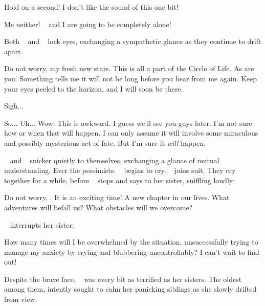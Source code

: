 \documentclass[main.tex]{subfiles}
\begin{document}
\par \Electra Hold on a second!  I don't like the sound of this one bit!

\par \Sterope Me neither! \rmelectra~ and I are going to be completely alone!

\par \nar Both \rmsterope~ and \rmelectra~ lock eyes, exchanging a sympathetic glance as they continue to drift apart.  

\par \Maia Do not worry, my fresh new stars. This is all a part of the Circle of Life.  As are you.  Something tells me it will not be long before you hear from me again. Keep your eyes peeled to the horizon, and I will soon be there.  

\par \Electra Sigh...  

\par \Taygete So... Uh... Wow.  This is awkward.  I guess we'll see you guys later.  I'm not sure how or when that will happen.  I can only assume it will involve some miraculous and possibly mysterious act of fate.  But I'm sure it \textit{will} happen.
  
\par \nar \rmtaygete~ and \rmalcyone~ snicker quietly to themselves, exchanging a glance of mutual understanding.  Ever the pessimists.  \rmelectra~ begins to cry.  \rmsterope~ joins suit.  They cry together for a while, before \rmsterope~ stops and says to her sister, sniffling loudly:

\par \Sterope Do not worry, \rmelectra.  It is an exciting time!  A new chapter in our lives.  What adventures will befall us?  What obstacles will we overcome?  

\par \nar \rmelectra~ interrupts her sister:

\par \Electra How many times will I be overwhelmed by the situation, unsuccessfully trying to manage my anxiety by crying and blubbering uncontrollably? I can't wait to find out!

\par \nar Despite the brave face, \rmmaia~ was every bit as terrified as her sisters.  The oldest among them, \rmmaia intently sought to calm her panicking siblings as she slowly drifted from view.
\end{document}
